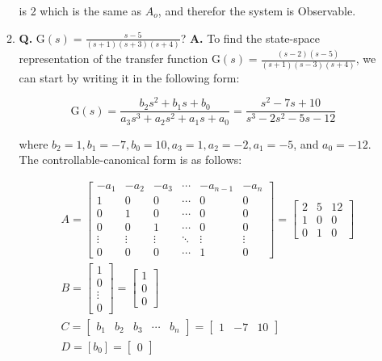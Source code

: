 \documentclass[main.tex]{subfiles}
\begin{document}
\begin{enumerate}
\begin{enumerate}
        is 2 which is the same as $A_o$, and therefor the system is Observable.
        
        \item \textbf{Q.} $\mathrm{G}(s)=\frac{s-5}{(s+1)(s+3)(s+4)}$? \textbf{A.} To find the state-space representation of the transfer function $\mathrm{G}(s)=\frac{(s-2)(s-5)}{(s+1)(s-3)(s+4)}$, we can start by writing it in the following form:

        $$
        \mathrm{G}(s)=\frac{b_2 s^2+b_1 s+b_0}{a_3 s^3+a_2 s^2+a_1 s+a_0}=\frac{s^2-7s+10}{s^3-2s^2-5s-12}
        $$
        
        where $b_2=1, b_1=-7, b_0=10, a_3=1, a_2=-2, a_1=-5$, and $a_0=-12$. The controllable-canonical form is as follows:

        $$
        \begin{aligned}
        & A = \left[\begin{array}{cccccc}
        -a_1 & -a_2 & -a_3 & \cdots & -a_{n-1} & -a_n \\
        1 & 0 & 0 & \cdots & 0 & 0 \\
        0 & 1 & 0 & \cdots & 0 & 0 \\
        0 & 0 & 1 & \cdots & 0 & 0 \\
        \vdots & \vdots & \vdots & \ddots & \vdots & \vdots \\
        0 & 0 & 0 & \cdots & 1 & 0
        \end{array}\right] = \left[\begin{array}{ccc}
        2 & 5 & 12 \\
        1 & 0 & 0 \\
        0 & 1 & 0
        \end{array}\right] \\
        & B = \left[\begin{array}{c}
        1 \\
        0 \\
        \vdots \\
        0
        \end{array}\right] = \left[\begin{array}{l}
        1 \\
        0 \\
        0
        \end{array}\right] \\
        & C=\left[\begin{array}{lllll}
        b_1 & b_2 & b_3 & \cdots & b_n
        \end{array}\right] = \left[\begin{array}{lll}
        1 & -7 & 10
        \end{array}\right] \\
        & D=\left[b_0\right] = \left[\begin{array}{ll}
        0
        \end{array}\right]\\
        \end{aligned}
        $$


\end{enumerate}
\end{enumerate}
\end{document}
